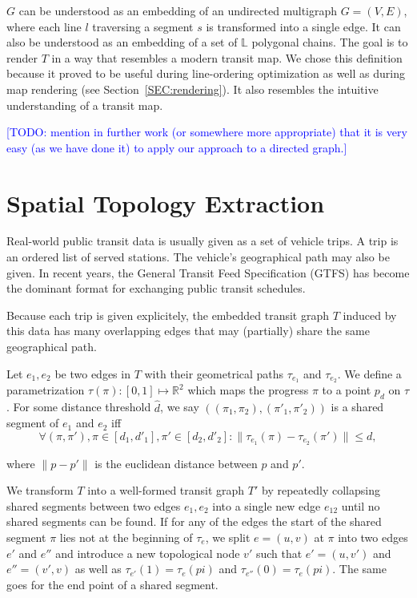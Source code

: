 \documentclass{llncs}
\newcommand\todo[1]{\textcolor{blue}{[TODO: #1]}}
\begin{document}
$G$ can be understood as an embedding of an undirected multigraph $G = (V, E)$, where each line $l$ traversing a segment $s$ is transformed into a single edge. It can also be understood as an embedding of a set of $\mathbb{L}$ polygonal chains.
The goal is to render $T$ in a way that resembles a modern transit map.
We chose this definition because it proved to be useful during line-ordering optimization as well as during map rendering (see Section~\ref{SEC:rendering}). It also resembles the intuitive understanding of a transit map.

\todo{mention in further work (or somewhere more appropriate) that it is very easy (as we have done it) to apply our approach to a directed graph.}

%
\section{Spatial Topology Extraction}\label{SEC:topo}
%

Real-world public transit data is usually given as a set of vehicle trips. A trip is an ordered list of served stations. The vehicle's geographical path may also be given. In recent years, the General Transit Feed Specification (GTFS) has become the dominant format for exchanging public transit schedules.

Because each trip is given explicitely, the embedded transit graph $T$ induced by this data has many overlapping edges that may (partially) share the same geographical path.

Let $e_1, e_2$ be two edges in $T$ with their geometrical paths $\tau_{e_1}$ and $\tau_{e_2}$. We define a parametrization $\tau(\pi): [0,1] \mapsto \mathbb{R}^2$ which maps the progress $\pi$ to a point $p_d$ on $\tau$. For some distance threshold $\hat{d}$, we say $((\pi_1, \pi_2), ({\pi'}_1, {\pi'}_2))$ is a shared segment of $e_1$ and $e_2$ iff \[\forall (\pi, \pi'), \pi \in [d_1, {d'}_1], \pi' \in [d_2, {d'}_2] : \|\tau_{e_1}(\pi) - \tau_{e_2}(\pi')\| \leq d,\]

where $\|p - p'\|$ is the euclidean distance between $p$ and $p'$.

We transform $T$ into a well-formed transit graph $T'$ by repeatedly collapsing shared segments between two edges $e_1, e_2$ into a single new edge $e_{12}$ until no shared segments can be found. If for any of the edges the start of the shared segment $\pi$ lies not at the beginning of $\tau_e$, we split $e = (u, v)$ at $\pi$ into two edges $e'$ and $e''$ and introduce a new topological node $v'$ such that $e' = (u, v')$ and $e'' = (v', v)$ as well as $\tau_{e'}(1) = \tau_{e}(pi)$ and $\tau_{e''}(0) = \tau_{e}(pi)$. The same goes for the end point of a shared segment.
\end{document}
